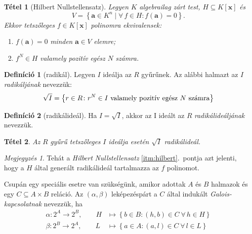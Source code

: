 \documentclass[%
	DIV=15,appendixprefix]{scrreprt}
\newtheorem*{tetel}{Tétel}
\theoremstyle{definition}
\newtheorem*{defin}{Definíció}
\theoremstyle{remark}
\newtheorem*{megj}{Megjegyzés}
\begin{document}
\begin{tetel}[Hilbert Nullstellensatz]
	Legyen $ K $ algebrailag zárt test, $ H \subseteq K \left[ \mathbf{ x } \right] $ és
	\begin{equation*}
		V = \left\{ \mathbf{ a } \in K^{ n } \mid \forall\,f \in H \colon f \left( \mathbf{ a }
		\right) = 0 \right\}.
	\end{equation*}
	Ekkor tetszőleges $ f \in K \left[ \mathbf{ x } \right] $ polinomra ekvivalensek:
	\begin{enumerate}
		\item $f \left( \mathbf{ a } \right) = 0$ minden $ \mathbf{ a } \in V $ elemre;
		\item\label{itm:hilbert} $f^{ N } \in H $ valamely pozitív egész $ N $ számra.
	\end{enumerate}
\end{tetel}
%
\begin{defin}[radikál]
	Legyen $ I $ ideálja az $ R $ gyűrűnek. Az alábbi halmazt az $ I $ \emph{radikáljának} nevezzük:
	\begin{equation*}
		\sqrt{ I } = \left\{ r \in R \colon r^N \in I\text{ valamely pozitív egész $ N $ számra}
		\right\}
	\end{equation*}
\end{defin}
\begin{defin}[radikálideál]
	Ha $ I = \sqrt{ I }$, akkor az I ideált az $ R $ \emph{radikálideáljának} nevezzük.
\end{defin}
\begin{tetel}
	Az $ R $ gyűrű tetszőleges $ I $ ideálja esetén $ \sqrt{ I } $ radikálideál.
\end{tetel}
\begin{megj}
	Tehát a \emph{Hilbert Nullstellensatz} \ref{itm:hilbert}.~pontja azt jelenti, hogy a $ H $ által
	generált radikálideál tartalmazza az $ f $ polinomot.
\end{megj}
%
Csupán egy speciális esetre van szükségünk, amikor adottak $ A $ és $ B $ halmazok és egy
$ C \subseteq A \times B $ reláció. Az $ \left( \alpha,{} \beta \right) $ leképezéspárt a $ C $
által indukált \emph{Galois-kapcsolatnak} nevezzük, ha
\begin{align*}
	\alpha \colon 2^{ A } \rightarrow 2^{ B }, \qquad H &\mapsto \left\{ b \in B \colon \left( h,{}
	b \right) \in C \  \forall\, h \in H \right\}\\
	\beta \colon 2^{ B } \rightarrow 2^{ A }, \qquad L &\mapsto \left\{ a \in A \colon \left( a,{}
	l \right) \in C \  \forall\, l \in L \right\}
\end{align*}
\end{document}
